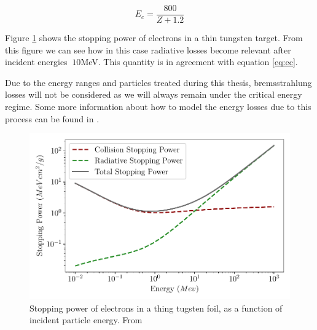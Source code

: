 \begin{equation}
    E_c = \frac{800}{Z + 1.2}
    \label{eq:ec}
\end{equation}








Figure \ref{fig:BremssVSion} shows the stopping power of electrons in a thin tungsten target. From this figure we can see how in this case radiative losses become relevant after incident energies $\> 10 $\si[]{\mega\electronvolt}. This quantity is in agreement with equation \ref{eq:ec}.  

Due to the energy ranges and particles treated during this thesis, bremsstrahlung losses will not be considered as we will always remain under the critical energy regime. Some more information about how to model the energy losses due to this process can be found in \parencite*[][]{ref:BremstutorialG4}. 

\begin{figure}[h]
    \centering
    \includegraphics[width=0.7\columnwidth]{Electron_Edep/ElectronEdep.pdf}
    \caption{Stopping power of electrons in a thing tugsten foil, as a function of incident particle energy. From \parencite*[][]{ref:NIST}}
    \label{fig:BremssVSion}
\end{figure}

